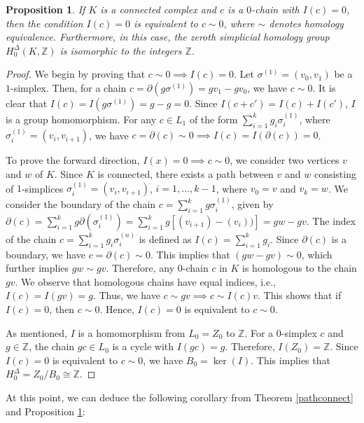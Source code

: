 \documentclass{amsart}
\newtheorem{proposition}[definition]{Proposition}
\begin{document}
\begin{proposition}
\label{decomposition}
If $K$ is a connected complex and $c$ is a $0$-chain with $I(c) = 0$, then the condition $I(c) = 0$ is equivalent to $c \sim 0$, where $\sim$ denotes homology equivalence. Furthermore, in this case, the zeroth simplicial homology group $H^\Delta_0(K,\mathbb{Z})$ is isomorphic to the integers $\mathbb{Z}$.
\end{proposition}

\begin{proof}
We begin by proving that $c \sim 0 \implies I(c) = 0$. Let $\sigma^{(1)} = (v_0,v_1)$ be a $1$-simplex. Then, for a chain $c = \partial(g\sigma^{(1)}) = gv_1-gv_0$, we have $c \sim 0$. It is clear that $I(c) = I(g\sigma^{(1)}) = g-g = 0$. Since $I(c+c') = I(c) + I(c')$, $I$ is a group homomorphism. For any $c \in L_1$ of the form $\sum_{i=1}^{k} g_i \sigma_i^{(1)}$, where $\sigma_i^{(1)} = (v_i,v_{i+1})$, we have $c = \partial(c) \sim 0 \implies I(c) = I(\partial(c)) = 0$.

To prove the forward direction, $I(x) = 0 \implies c \sim 0$, we consider two vertices $v$ and $w$ of $K$. Since $K$ is connected, there exists a path between $v$ and $w$ consisting of $1$-simplices $\sigma_i^{(1)} = (v_i,v_{i+1})$, $i=1,\ldots,k-1$, where $v_0 = v$ and $v_k = w$. We consider the boundary of the chain $c = \sum_{i=1}^{k} g \sigma_i^{(1)}$, given by $\partial(c) = \sum_{i=1}^{k}g \partial(\sigma_i^{(1)}) = \sum_{i=1}^{k}g [(v_{i+1}) - (v_i))] = gw - gv$. The index of the chain $c = \sum_{i=1}^{k} g_i \sigma_i^{(n)}$ is defined as $I(c) = \sum_{i=1}^{k} g_i$. Since $\partial(c)$ is a boundary, we have $c = \partial(c) \sim 0$. This implies that $(gw-gv) \sim 0$, which further implies $gw \sim gv$. Therefore, any $0$-chain $c$ in $K$ is homologous to the chain $gv$. We observe that homologous chains have equal indices, i.e., $I(c) = I(gv) = g$. Thus, we have $c \sim gv \implies c \sim I(c)v$. This shows that if $I(c) = 0$, then $c \sim 0$. Hence, $I(c) = 0$ is equivalent to $c \sim 0$.

As mentioned, $I$ is a homomorphism from $L_0 = Z_0$ to $\mathbb{Z}$. For a $0$-simplex $c$ and $g \in \mathbb{Z}$, the chain $gc \in L_0$ is a cycle with $I(gc) = g$. Therefore, $I(Z_0) = \mathbb{Z}$. Since $I(c) = 0$ is equivalent to $c \sim 0$, we have $B_0 = \ker(I)$. This implies that $H^\Delta_0 = Z_0/B_0 \cong \mathbb{Z}$.
\end{proof}

At this point, we can deduce the following corollary from Theorem \ref{pathconnect} and Proposition \ref{decomposition}:
\end{document}
